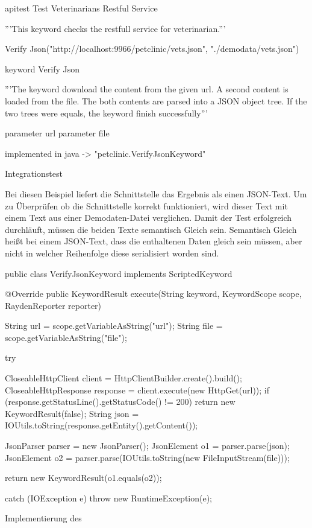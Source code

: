 \begin{program}
\begin{JavaCode}
apitest Test Veterinarians Restful Service {
	'''This keyword checks the restfull service for veterinarian.'''
	
	Verify Json("http://localhost:9966/petclinic/vets.json", 
	            "./demodata/vets.json")
}

keyword Verify Json {
  '''The keyword download the content from the given url. A second 
	   content is loaded from the file. The both contents are parsed
		 into a JSON object tree. If the two trees were equals, the 
		 keyword finish successfully'''
		
	parameter url
	parameter file

	implemented in java -> "petclinic.VerifyJsonKeyword"
}
\end{JavaCode}
\caption{Integrationstest }
\label{prog:integrationTest}
\end{program}

\SuperPar 
Bei diesen Beispiel liefert die Schnittstelle das Ergebnis als einen JSON-Text. Um zu Überprüfen ob die Schnittstelle korrekt funktioniert, wird dieser Text mit einem Text aus einer Demodaten-Datei verglichen. Damit der Test erfolgreich durchläuft, müssen die beiden Texte semantisch Gleich sein. Semantisch Gleich heißt bei einem JSON-Text, dass die enthaltenen Daten gleich sein müssen, aber nicht in welcher Reihenfolge diese serialisiert worden sind.

\begin{program}
\begin{JavaCode}
public class VerifyJsonKeyword implements ScriptedKeyword {
  @Override
  public KeywordResult execute(String keyword, KeywordScope scope, RaydenReporter reporter) {
    String url = scope.getVariableAsString("url");
    String file = scope.getVariableAsString("file");

    try {
      CloseableHttpClient client = HttpClientBuilder.create().build();
      CloseableHttpResponse response = client.execute(new HttpGet(url));
      if (response.getStatusLine().getStatusCode() != 200) {
        return new KeywordResult(false);
      }
      String json = IOUtils.toString(response.getEntity().getContent());

      JsonParser parser = new JsonParser();
      JsonElement o1 = parser.parse(json);
      JsonElement o2 = parser.parse(IOUtils.toString(new FileInputStream(file)));

      return new KeywordResult(o1.equals(o2));
    } catch (IOException e) {
      throw new RuntimeException(e);
    }
  }
}
\end{JavaCode}
\caption{Implementierung des }
\label{prog:integrationTestImpl}
\end{program}


